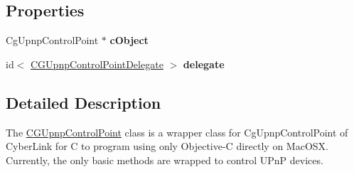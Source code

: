 \subsection*{Properties}
\begin{DoxyCompactItemize}
\item 
\hypertarget{interface_c_g_upnp_control_point_a0ed90a1d7119f833295e540475d56f72}{Cg\-Upnp\-Control\-Point $\ast$ {\bfseries c\-Object}}\label{interface_c_g_upnp_control_point_a0ed90a1d7119f833295e540475d56f72}

\item 
\hypertarget{interface_c_g_upnp_control_point_a5aabce13d286ffdd4d1da4a34e7d552c}{id$<$ \hyperlink{protocol_c_g_upnp_control_point_delegate-p}{C\-G\-Upnp\-Control\-Point\-Delegate} $>$ {\bfseries delegate}}\label{interface_c_g_upnp_control_point_a5aabce13d286ffdd4d1da4a34e7d552c}

\end{DoxyCompactItemize}


\subsection{Detailed Description}
The \hyperlink{interface_c_g_upnp_control_point}{C\-G\-Upnp\-Control\-Point} class is a wrapper class for Cg\-Upnp\-Control\-Point of Cyber\-Link for C to program using only Objective-\/\-C directly on Mac\-O\-S\-X. Currently, the only basic methods are wrapped to control U\-Pn\-P devices. 

